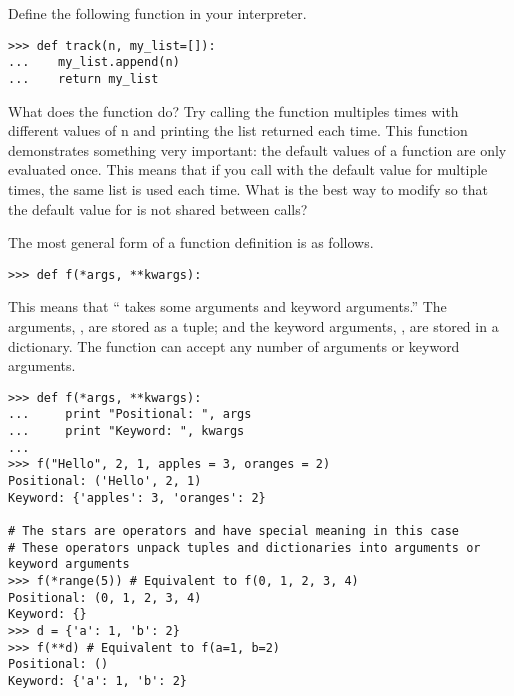 \begin{example}
\begin{problem}
Define the following function in your interpreter.
\begin{lstlisting}
>>> def track(n, my_list=[]):
...    my_list.append(n)
...    return my_list
\end{lstlisting}
What does the function do?
Try calling the function multiples times with different values of n and printing the list returned each time.
This function demonstrates something very important: the default values of a function are only evaluated once.
This means that if you call  with the default value for  multiple times, the same list is used each time.
What is the best way to modify  so that the default value for  is not shared between calls?
\end{problem}

The most general form of a function definition is as follows.
\begin{lstlisting}
>>> def f(*args, **kwargs):
\end{lstlisting}
This means that `` takes some arguments and keyword arguments.''
The arguments, , are stored as a tuple; and the keyword arguments, , are stored in a dictionary.
The function  can accept any number of arguments or keyword arguments.
\begin{lstlisting}
>>> def f(*args, **kwargs):
...     print "Positional: ", args
...     print "Keyword: ", kwargs
...     
>>> f("Hello", 2, 1, apples = 3, oranges = 2)
Positional: ('Hello', 2, 1)
Keyword: {'apples': 3, 'oranges': 2}

# The stars are operators and have special meaning in this case
# These operators unpack tuples and dictionaries into arguments or keyword arguments
>>> f(*range(5)) # Equivalent to f(0, 1, 2, 3, 4)
Positional: (0, 1, 2, 3, 4)
Keyword: {}
>>> d = {'a': 1, 'b': 2}
>>> f(**d) # Equivalent to f(a=1, b=2)
Positional: ()
Keyword: {'a': 1, 'b': 2}
\end{lstlisting}
\end{example}

